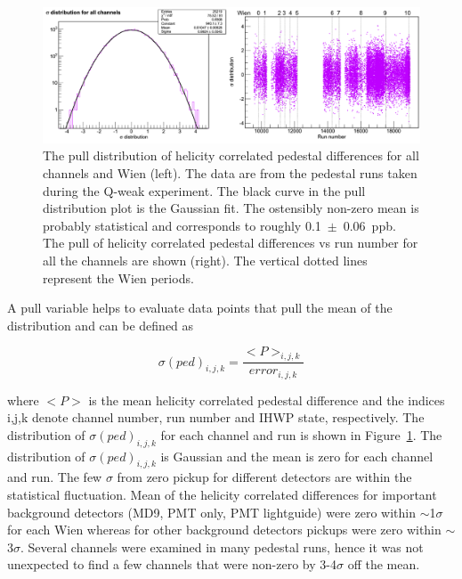 \begin{singlespace}
\begin{figure}[!h]
	\centering
	\includegraphics[width=15.0cm]{figures/sigmaDistribution}
	\caption
	{The pull distribution of helicity correlated pedestal differences for all channels and Wien (left). The data are from the pedestal runs taken during the Q-weak experiment. The black curve in the pull distribution plot is the Gaussian fit. The ostensibly non-zero mean is probably statistical and corresponds to roughly 0.1~$\pm$~0.06~ppb. The pull of helicity correlated pedestal differences vs run number for all the channels are shown (right). The vertical dotted lines represent the Wien periods.}
	\label{fig:sigmaDistribution}
\end{figure}
\end{singlespace}




A pull variable helps to evaluate data points that pull the mean of the distribution and can be defined as 

\begin{equation} \label{equ:calcPedError}
\sigma(ped)_{i,j,k} = \frac{<P>_{i,j,k}}{error_{i,j,k}}
\end{equation}

\noindent
where $<P>$ is the mean helicity correlated pedestal difference and the indices i,j,k denote channel number, run number and IHWP state, respectively.
The distribution of $\sigma(ped)_{i,j,k}$ for each channel and run is shown in Figure~\ref{fig:sigmaDistribution}. 
The distribution of $\sigma(ped)_{i,j,k}$ is Gaussian and the mean is zero for each channel and run. The few $\sigma$ from zero pickup for different detectors are within the statistical fluctuation. 
Mean of the helicity correlated differences for important background detectors (MD9, PMT only, PMT lightguide) were zero within $\sim$1$\sigma$ for each Wien whereas for other background detectors pickups were zero within $\sim$3$\sigma$. Several channels were examined in many pedestal runs, hence it was not unexpected to find a few channels that were non-zero by 3-4$\sigma$ off the mean.


